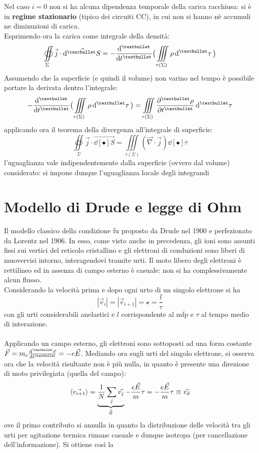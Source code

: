 Nel caso $i = 0$ non si ha alcuna dipendenza temporale della carica racchiusa: si è in \textbf{regime stazionario} (tipico dei circuiti CC), in cui non si hanno nè accumuli ne diminuzioni di carica.
\\Esprimendo ora la carica come integrale della densità:
\[\oiint\limits_\Sigma \vec{j} \cdot \vec{\dd[•]{S}} = - \dv[•]{}{t} \big(\iiint\limits_{\tau(\Sigma)} \rho \dd[•]{\tau}\big)\]
Assumendo che la superficie (e quindi il volume) non varino nel tempo è possibile portare la derivata dentro l'integrale:
\[- \dv[•]{}{t} \big(\iiint\limits_{\tau(\Sigma)} \rho \dd[•]{\tau}\big) = \iiint\limits_{\tau(\Sigma)} \pdv[•]{\rho}{t} \dd[•]{\tau}\]
applicando ora il teorema della divergenza all'integrale di superficie:
\[\oiint\limits_\Sigma \vec{j} \cdot \vec{\dd[•]{S}} = \iiint\limits_{\tau(\Sigma)} (\vec{\nabla} \cdot \vec{j}) \dd[•]{\tau}\]
l'uguaglianza vale indipendentemente dalla superficie (ovvero dal volume) considerato: si impone dunque l'uguaglianza locale degli integrandi


\section{Modello di Drude e legge di Ohm}
Il modello classico della condizione fu proposto da Drude nel 1900 e perfezionato da Lorentz nel 1906. In esso, come visto anche in precedenza, gli ioni sono assunti fissi sui vertici del reticolo cristallino e gli elettroni di conduzioni sono liberi di muovervisi intorno, interagendovi tramite urti. Il moto libero degli elettroni è rettilineo ed in assenza di campo esterno è casuale: non si ha complessivamente alcun flusso.
\\Considerando la velocità prima e dopo ogni urto di un singolo elettrone si ha
\[|\vec{v}_i| = |\vec{v}_{i+1}| = \mathcal{v} = \frac{l}{\tau}\]
con gli urti considerabili anelastici e $l$ corrispondente al mfp e $\tau$ al tempo medio di interazione.
\\~\\
Applicando un campo esterno, gli elettroni sono sottoposti ad una forza costante $\vec{F} = m_e \dv[•]{\vec{v}}{t} = - e \vec{E}$. Mediando ora sugli urti del singolo elettrone, si osserva ora che la velocità risultante non è più nulla, in quanto è presente una direzione di moto privilegiata (quella del campo):
\[\langle \vec{v_{i+1}} \rangle = \underbrace{\frac{1}{N} \sum_j \vec{v_j}}_{\vec{0}} - \frac{e \vec{E}}{m} \tau = - \frac{e \vec{E}}{m} \tau \equiv \vec{v_d}\]
ove il primo contributo si annulla in quanto la distribuzione delle velocità tra gli urti per agitazione termica rimane casuale e dunque isotropa (per cancellazione dell'informazione). Si ottiene così la

